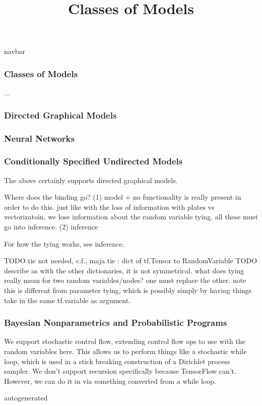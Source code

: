 \title{Classes of Models}

{{navbar}}

\subsubsection{Classes of Models}

...

\subsubsection{Directed Graphical Models}

\subsubsection{Neural Networks}

\subsubsection{Conditionally Specified Undirected Models}

The above certainly supports directed graphical models.

Where does the binding go?
(1) model
+ no functionality is really present in order to do this. just like
with the loss of information with plates vs vectorizatoin, we lose
information about the random variable tying. all these must go into
inference.
(2) inference

For how the tying works, see inference.

TODO tie not needed, c.f., maja
tie : dict of tf.Tensor to RandomVariable
  TODO describe
  as with the other dictionaries, it is not symmetrical. what does
  tying really mean for two random variables/nodes? one must replace
  the other. note this is different from parameter tying, which is
  possibly simply by having things take in the same tf.variable as
  argument.

\subsubsection{Bayesian Nonparametrics and Probabilistic Programs}

We support stochastic control flow, extending control flow ops to use
with the random variables here. This allows us to perform things like
a stochastic while loop, which is used in a stick breaking
construction of a Dirichlet process sampler. We don't support
recursion specifically because TensorFlow can't. However, we can do it
in via something converted from a while loop.

{{autogenerated}}
